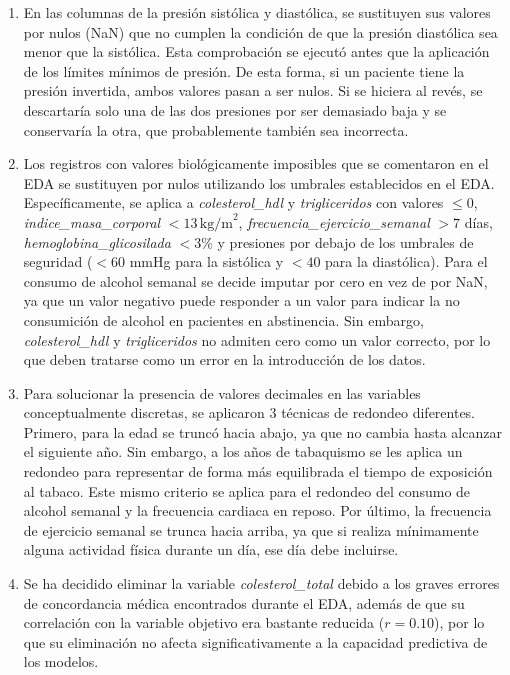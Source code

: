 \documentclass[journal,onecolumn]{IEEEtran}
\begin{document}
\begin{enumerate}
    \item En las columnas de la presión sistólica y diastólica, se sustituyen sus valores por nulos (NaN) que no cumplen la condición de que la presión diastólica sea menor que la sistólica. Esta comprobación se ejecutó antes que la aplicación de los límites mínimos de presión. De esta forma, si un paciente tiene la presión invertida, ambos valores pasan a ser nulos. Si se hiciera al revés, se descartaría solo una de las dos presiones por ser demasiado baja y se conservaría la otra, que probablemente también sea incorrecta.

    \item Los registros con valores biológicamente imposibles que se comentaron en el EDA se sustituyen por nulos utilizando los umbrales establecidos en el EDA. Específicamente, se aplica a \textit{colesterol\_hdl} y \textit{trigliceridos} con valores $\le 0$, \textit{indice\_masa\_corporal} $<13\,\text{kg/m}^2$, \textit{frecuencia\_ejercicio\_semanal} $>7$ días, \textit{hemoglobina\_glicosilada} $<3\%$ y presiones por debajo de los umbrales de seguridad ($<60$ mmHg para la sistólica y $<40$ para la diastólica). Para el consumo de alcohol semanal se decide imputar por cero en vez de por NaN, ya que un valor negativo puede responder a un valor para indicar la no consumición de alcohol en pacientes en abstinencia. Sin embargo, \textit{colesterol\_hdl} y \textit{trigliceridos} no admiten cero como un valor correcto, por lo que deben tratarse como un error en la introducción de los datos.

    \item Para solucionar la presencia de valores decimales en las variables conceptualmente discretas, se aplicaron 3 técnicas de redondeo diferentes. Primero, para la edad se truncó hacia abajo, ya que no cambia hasta alcanzar el siguiente año. Sin embargo, a los años de tabaquismo se les aplica un redondeo para representar de forma más equilibrada el tiempo de exposición al tabaco. Este mismo criterio se aplica para el redondeo del consumo de alcohol semanal y la frecuencia cardiaca en reposo. Por último, la frecuencia de ejercicio semanal se trunca hacia arriba, ya que si realiza mínimamente alguna actividad física durante un día, ese día debe incluirse.

    \item Se ha decidido eliminar la variable \textit{colesterol\_total} debido a los graves errores de concordancia médica encontrados durante el EDA, además de que su correlación con la variable objetivo era bastante reducida ($r=0.10$), por lo que su eliminación no afecta significativamente a la capacidad predictiva de los modelos.


\end{enumerate}
\end{document}
